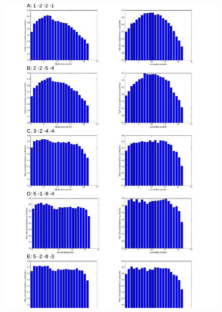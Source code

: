 \documentclass[12pt]{article}
\begin{document}
\begin{figure}
\vspace{-1cm}
\includegraphics[scale=0.65]{results/compl1.png}
\end{figure}
\end{document}
